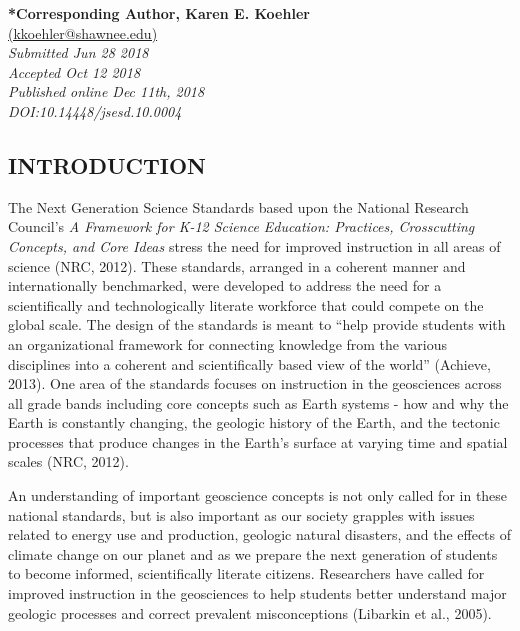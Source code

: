 \documentclass[11.5pt]{sig-alternate} %
\begin{document}

\textbf{*Corresponding Author, Karen E. Koehler}\\
\href{mailto: kkoehler@shawnee.edu }{(kkoehler@shawnee.edu)} \\
\textit{Submitted  Jun 28 2018 }\\
\textit{Accepted Oct 12 2018} \\
\textit{Published online Dec 11th, 2018} \\
\textit{DOI:10.14448/jsesd.10.0004} \\
\pagebreak
\clearpage
\begin{large}
\section*{INTRODUCTION}
The Next Generation Science Standards based upon the National Research Council’s \textit{A Framework for K-12 Science Education: Practices, Crosscutting Concepts, and Core Ideas} stress the need for improved instruction in all areas of science (NRC, 2012). These standards, arranged in a coherent manner and internationally benchmarked, were developed to address the need for a scientifically and technologically literate workforce that could compete on the global scale.  The design of the standards is meant to “help provide students with an organizational framework for connecting knowledge from the various disciplines into a coherent and scientifically based view of the world” (Achieve, 2013).  One area of the standards focuses on instruction in the geosciences across all grade bands including core concepts such as Earth systems - how and why the Earth is constantly changing, the geologic history of the Earth, and the tectonic processes that produce changes in the Earth’s surface at varying time and spatial scales (NRC, 2012).  

An understanding of important geoscience concepts is not only called for in these national standards, but is also important as our society grapples with issues related to energy use and production, geologic natural disasters, and the effects of climate change on our planet and as we prepare the next generation of students to become informed, scientifically literate citizens.  Researchers have called for improved instruction in the geosciences to help students better understand major geologic processes and correct prevalent misconceptions (Libarkin et al., 2005).  


\end{large}
\end{document}

